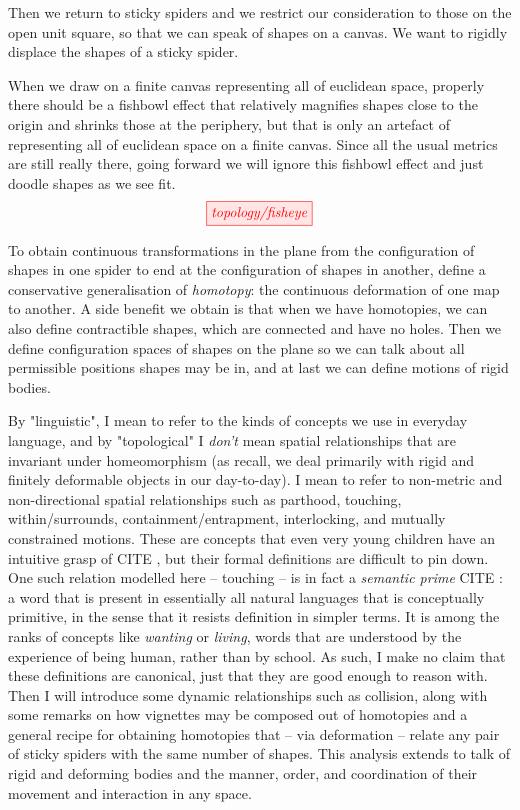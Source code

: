 
Then we return to sticky spiders and we restrict our consideration to those on the open unit square, so that we can speak of shapes on a canvas. We want to rigidly displace the shapes of a sticky spider.

\begin{remark}
When we draw on a finite canvas representing all of euclidean space, properly there should be a fishbowl effect that relatively magnifies shapes close to the origin and shrinks those at the periphery, but that is only an artefact of representing all of euclidean space on a finite canvas. Since all the usual metrics are still really there, going forward we will ignore this fishbowl effect and just doodle shapes as we see fit.
\[\tikzfig{topology/fisheye}\]
\end{remark}


To obtain continuous transformations in the plane from the configuration of shapes in one spider to end at the configuration of shapes in another, define a conservative generalisation of \emph{homotopy}: the continuous deformation of one map to another. A side benefit we obtain is that when we have homotopies, we can also define contractible shapes, which are connected and have no holes. Then we define configuration spaces of shapes on the plane so we can talk about all permissible positions shapes may be in, and at last we can define motions of rigid bodies.


By "linguistic", I mean to refer to the kinds of concepts we use in everyday language, and by "topological" I \emph{don't} mean spatial relationships that are invariant under homeomorphism (as recall, we deal primarily with rigid and finitely deformable objects in our day-to-day). I mean to refer to non-metric and non-directional spatial relationships such as parthood, touching, within/surrounds, containment/entrapment, interlocking, and mutually constrained motions. These are concepts that even very young children have an intuitive grasp of \bR CITE \e, but their formal definitions are difficult to pin down. One such relation modelled here -- touching -- is in fact a \emph{semantic prime} \bR CITE \e: a word that is present in essentially all natural languages that is conceptually primitive, in the sense that it resists definition in simpler terms. It is among the ranks of concepts like \emph{wanting} or \emph{living}, words that are understood by the experience of being human, rather than by school. As such, I make no claim that these definitions are canonical, just that they are good enough to reason with. Then I will introduce some dynamic relationships such as collision, along with some remarks on how vignettes may be composed out of homotopies and a general recipe for obtaining homotopies that -- via deformation -- relate any pair of sticky spiders with the same number of shapes. This analysis extends to talk of rigid and deforming bodies and the manner, order, and coordination of their movement and interaction in any space.

